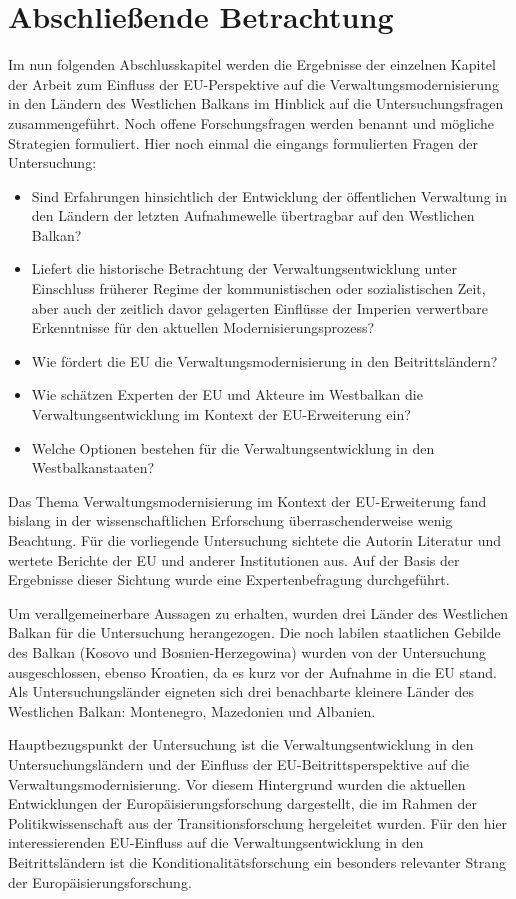 \chapter{Abschließende Betrachtung}\label{chap:abschlBetrachtung}
Im nun folgenden Abschlusskapitel werden die Ergebnisse der einzelnen Kapitel der Arbeit zum Einfluss der EU-Perspektive auf die Verwaltungsmodernisierung in den Ländern des Westlichen Balkans im Hinblick auf die Untersuchungsfragen zusammengeführt. Noch offene Forschungsfragen werden benannt und mögliche Strategien formuliert. Hier noch einmal die eingangs formulierten Fragen der Untersuchung:
\begin{itemize} \itemsep1pt \parskip0pt 
\item Sind Erfahrungen hinsichtlich der Entwicklung der öffentlichen Verwaltung in den Ländern der letzten Aufnahmewelle übertragbar auf den Westlichen Balkan?
\item Liefert die historische Betrachtung der Verwaltungsentwicklung unter Einschluss früherer Regime der kommunistischen oder sozialistischen Zeit, aber auch der zeitlich davor gelagerten Einflüsse der Imperien verwertbare Erkenntnisse für den aktuellen Modernisierungsprozess?
\item Wie fördert die EU die Verwaltungsmodernisierung in den Beitrittsländern?
\item Wie schätzen Experten der EU und Akteure im Westbalkan die Verwaltungsentwicklung im Kontext der EU-Erweiterung ein?
\item Welche Optionen bestehen für die Verwaltungsentwicklung in den Westbalkanstaaten?
\end{itemize}
Das Thema Verwaltungsmodernisierung im Kontext der EU-Erweiterung fand bislang in der wissenschaftlichen Erforschung überraschenderweise wenig Beachtung. Für die vorliegende Untersuchung sichtete die Autorin Literatur und wertete Berichte der EU und anderer Institutionen aus. Auf der Basis der Ergebnisse dieser Sichtung wurde eine Expertenbefragung durchgeführt.\par
Um verallgemeinerbare Aussagen zu erhalten, wurden drei Länder des Westlichen Balkan für die Untersuchung herangezogen. Die noch labilen staatlichen Gebilde des Balkan (Kosovo und Bosnien-Herzegowina) wurden von der Untersuchung ausgeschlossen, ebenso Kroatien, da es kurz vor der Aufnahme in die EU stand. Als Untersuchungsländer eigneten sich drei benachbarte kleinere Länder des Westlichen Balkan: Montenegro, Mazedonien und Albanien.\par
Hauptbezugspunkt der Untersuchung ist die Verwaltungsentwicklung in den Untersuchungsländern und der Einfluss der EU-Beitrittsperspektive auf die Verwaltungsmodernisierung. Vor diesem Hintergrund wurden die aktuellen Entwicklungen der Europäisierungsforschung dargestellt, die im Rahmen der Politikwissenschaft aus der Transitionsforschung hergeleitet wurden. Für den hier interessierenden EU-Einfluss auf die Verwaltungsentwicklung in den Beitrittsländern ist die Konditionalitätsforschung ein besonders relevanter Strang der Europäisierungsforschung.\par

